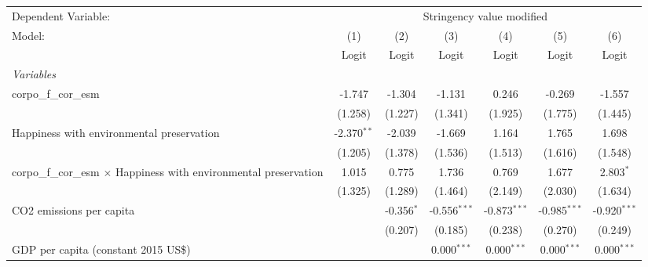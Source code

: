 
\begingroup
\centering
\begin{tabular}{lcccccc}
   \toprule
   Dependent Variable: & \multicolumn{6}{c}{Stringency value modified}\\
   Model:                                                                    & (1)           & (2)          & (3)            & (4)            & (5)            & (6)\\  
                                                                             &  Logit        & Logit        & Logit          & Logit          & Logit          & Logit\\  
   \midrule
   \emph{Variables}\\
   corpo\_f\_cor\_esm                                                        & -1.747        & -1.304       & -1.131         & 0.246          & -0.269         & -1.557\\   
                                                                             & (1.258)       & (1.227)      & (1.341)        & (1.925)        & (1.775)        & (1.445)\\   
   Happiness with environmental preservation                                 & -2.370$^{**}$ & -2.039       & -1.669         & 1.164          & 1.765          & 1.698\\   
                                                                             & (1.205)       & (1.378)      & (1.536)        & (1.513)        & (1.616)        & (1.548)\\   
   corpo\_f\_cor\_esm $\times$ Happiness with environmental preservation     & 1.015         & 0.775        & 1.736          & 0.769          & 1.677          & 2.803$^{*}$\\   
                                                                             & (1.325)       & (1.289)      & (1.464)        & (2.149)        & (2.030)        & (1.634)\\   
   CO2 emissions per capita                                                  &               & -0.356$^{*}$ & -0.556$^{***}$ & -0.873$^{***}$ & -0.985$^{***}$ & -0.920$^{***}$\\   
                                                                             &               & (0.207)      & (0.185)        & (0.238)        & (0.270)        & (0.249)\\   
   GDP per capita (constant 2015 US\$)                                       &               &              & 0.000$^{***}$  & 0.000$^{***}$  & 0.000$^{***}$  & 0.000$^{***}$\\   

\end{tabular}
